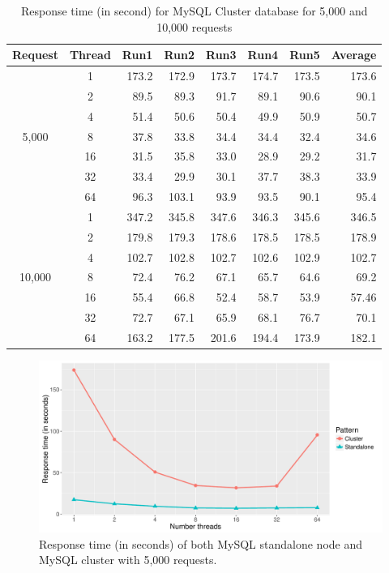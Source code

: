 \documentclass{article}
\begin{document}
\begin{table}[]
	\centering
	\caption{Response time (in second) for MySQL Cluster database for 5,000 and 10,000 requests}
	\label{tab:cluster}
	\begin{tabular}{|c|c|r|r|r|r|r|r|}
		\hline
		\textbf{Request} & \textbf{Thread} & \textbf{Run1} & \textbf{Run2} & \textbf{Run3} & \textbf{Run4} & \textbf{Run5} & \textbf{Average}\\ \hline
		\multirow{7}{*}{5,000} & 1 & 173.2 & 172.9 & 173.7 & 174.7 & 173.5 & 173.6 \\ \cline{2-8}
		{} & 2 & 89.5  & 89.3  & 91.7  & 89.1  & 90.6  & 90.1  \\ \cline{2-8}
		{} & 4 & 51.4  & 50.6  & 50.4  & 49.9  & 50.9  & 50.7  \\ \cline{2-8}
		{} & 8 & 37.8  & 33.8  & 34.4  & 34.4  & 32.4  & 34.6  \\ \cline{2-8}
		{} & 16 & 31.5  & 35.8  & 33.0  & 28.9  & 29.2  & 31.7  \\ \cline{2-8}
		{} & 32 & 33.4  & 29.9  & 30.1  & 37.7  & 38.3  & 33.9   \\ \cline{2-8}
		{} & 64 & 96.3  & 103.1 & 93.9  & 93.5  & 90.1  & 95.4  \\ \hline
		\multirow{7}{*}{10,000} & 1 & 347.2  & 345.8 & 347.6 & 346.3 & 345.6 & 346.5 \\ \cline{2-8}
		{} & 2 & 179.8 & 179.3  & 178.6 & 178.5 & 178.5 & 178.9 \\ \cline{2-8}
		{} & 4 & 102.7 & 102.8 & 102.7 & 102.6 & 102.9 & 102.7 \\ \cline{2-8}
		{} & 8 & 72.4  & 76.2  & 67.1   & 65.7   & 64.6  & 69.2  \\ \cline{2-8}
		{} & 16 & 55.4  & 66.8  & 52.4  & 58.7  & 53.9  & 57.46  \\ \cline{2-8}
		{} & 32 & 72.7  & 67.1  & 65.9  & 68.1  & 76.7  & 70.1  \\ \cline{2-8}
		{} & 64 & 163.2 & 177.5 & 201.6 & 194.4 & 173.9 & 182.1  \\ \hline
	\end{tabular}
\end{table}

\begin{figure}[t]
    \centering
        \includegraphics[width = \columnwidth]{images/5000.pdf}
    \caption{Response time (in seconds) of both MySQL standalone node and MySQL cluster with 5,000 requests.}
    \label{fig:5000}
\end{figure}
\end{document}
